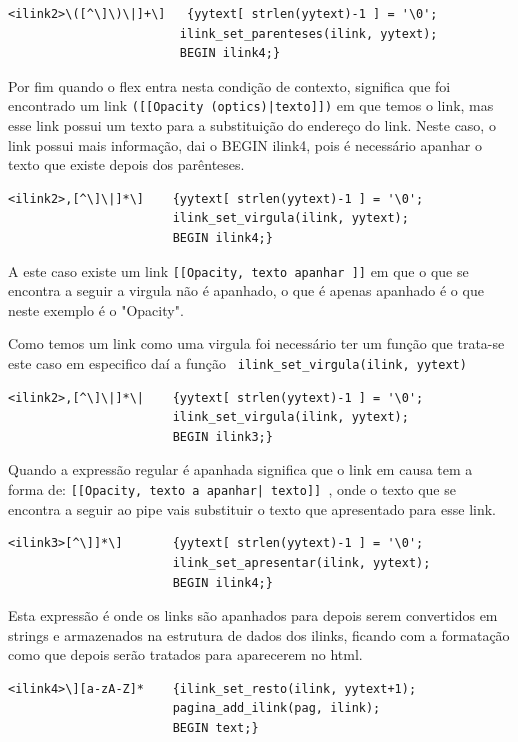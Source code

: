 \documentclass[11pt, a4paper, oneside]{article}
\begin{document}
\begin{verbatim}
<ilink2>\([^\]\)\|]+\]   {yytext[ strlen(yytext)-1 ] = '\0';
                        ilink_set_parenteses(ilink, yytext);
                        BEGIN ilink4;}
\end{verbatim}
Por fim quando o flex entra nesta condição de contexto, significa que foi encontrado um link \texttt{([[Opacity (optics)|texto]])} em que temos o link, mas esse link possui um texto para a substituição do endereço do link.
Neste caso, o link possui mais informação, dai o BEGIN ilink4, pois é necessário apanhar o texto que existe depois dos parênteses.

\begin{verbatim}
<ilink2>,[^\]\|]*\]    {yytext[ strlen(yytext)-1 ] = '\0';
                       ilink_set_virgula(ilink, yytext);
                       BEGIN ilink4;}
\end{verbatim}
A este caso existe um link \texttt{[[Opacity, texto apanhar ]]} em que o que se encontra a seguir a virgula não é apanhado, o que é apenas apanhado é o que neste exemplo é o "Opacity".

Como temos um link como uma virgula foi necessário ter um função que trata-se este caso em especifico daí a função \texttt{ ilink\_set\_virgula(ilink, yytext)}

\begin{verbatim}
<ilink2>,[^\]\|]*\|    {yytext[ strlen(yytext)-1 ] = '\0';
                       ilink_set_virgula(ilink, yytext);
                       BEGIN ilink3;}
\end{verbatim}

Quando a expressão regular é apanhada significa que o link em causa tem a forma de: \texttt{[[Opacity, texto a apanhar| texto]] }, onde o texto que se encontra a seguir ao pipe vais substituir o texto que apresentado para esse link.

\begin{verbatim}
<ilink3>[^\]]*\]       {yytext[ strlen(yytext)-1 ] = '\0';
                       ilink_set_apresentar(ilink, yytext);
                       BEGIN ilink4;}
\end{verbatim}


Esta expressão é onde os links são apanhados para depois serem convertidos em strings e armazenados na estrutura de dados dos ilinks, ficando com a formatação como que depois serão tratados para aparecerem no html.

\begin{verbatim}
<ilink4>\][a-zA-Z]*    {ilink_set_resto(ilink, yytext+1);
                       pagina_add_ilink(pag, ilink);
                       BEGIN text;}
\end{verbatim}
\end{document}
